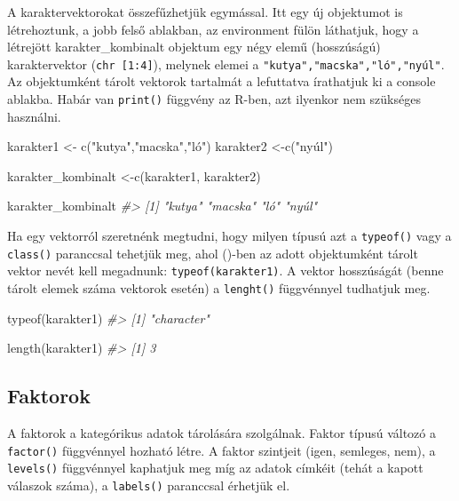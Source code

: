 \documentclass[
]{book}
\newenvironment{Shaded}{\begin{snugshade}}{\end{snugshade}}
\newcommand{\CommentTok}[1]{\textcolor[rgb]{0.56,0.35,0.01}{\textit{#1}}}
\newcommand{\FunctionTok}[1]{\textcolor[rgb]{0.00,0.00,0.00}{#1}}
\newcommand{\NormalTok}[1]{#1}
\newcommand{\OtherTok}[1]{\textcolor[rgb]{0.56,0.35,0.01}{#1}}
\newcommand{\StringTok}[1]{\textcolor[rgb]{0.31,0.60,0.02}{#1}}
\begin{document}
A karaktervektorokat összefűzhetjük egymással. Itt egy új objektumot is
létrehoztunk, a jobb felső ablakban, az environment fülön láthatjuk,
hogy a létrejött karakter\_kombinalt objektum egy négy elemű
(hosszúságú) karaktervektor (\texttt{chr\ {[}1:4{]}}), melynek elemei a
\texttt{"kutya","macska","ló","nyúl"}. Az objektumként tárolt vektorok
tartalmát a lefuttatva írathatjuk ki a console ablakba. Habár van
\texttt{print()} függvény az R-ben, azt ilyenkor nem szükséges
használni.

\begin{Shaded}
\begin{Highlighting}[]
\NormalTok{karakter1 }\OtherTok{\textless{}{-}} \FunctionTok{c}\NormalTok{(}\StringTok{"kutya"}\NormalTok{,}\StringTok{"macska"}\NormalTok{,}\StringTok{"ló"}\NormalTok{)}
\NormalTok{karakter2 }\OtherTok{\textless{}{-}}\FunctionTok{c}\NormalTok{(}\StringTok{"nyúl"}\NormalTok{)}

\NormalTok{karakter\_kombinalt }\OtherTok{\textless{}{-}}\FunctionTok{c}\NormalTok{(karakter1, karakter2)}

\NormalTok{karakter\_kombinalt}
\CommentTok{\#\textgreater{} [1] "kutya"  "macska" "ló"     "nyúl"}
\end{Highlighting}
\end{Shaded}

Ha egy vektorról szeretnénk megtudni, hogy milyen típusú azt a
\texttt{typeof()} vagy a \texttt{class()} paranccsal tehetjük meg, ahol
()-ben az adott objektumként tárolt vektor nevét kell megadnunk:
\texttt{typeof(karakter1)}. A vektor hosszúságát (benne tárolt elemek
száma vektorok esetén) a \texttt{lenght()} függvénnyel tudhatjuk meg.

\begin{Shaded}
\begin{Highlighting}[]
\FunctionTok{typeof}\NormalTok{(karakter1)}
\CommentTok{\#\textgreater{} [1] "character"}

\FunctionTok{length}\NormalTok{(karakter1)}
\CommentTok{\#\textgreater{} [1] 3}
\end{Highlighting}
\end{Shaded}

\hypertarget{faktorok}{%
\subsection{Faktorok}\label{faktorok}}

A faktorok a kategórikus adatok tárolására szolgálnak. Faktor típusú
változó a \texttt{factor()} függvénnyel hozható létre. A faktor
szintjeit (igen, semleges, nem), a \texttt{levels()} függvénnyel
kaphatjuk meg míg az adatok címkéit (tehát a kapott válaszok száma), a
\texttt{labels()} paranccsal érhetjük el.
\end{document}
